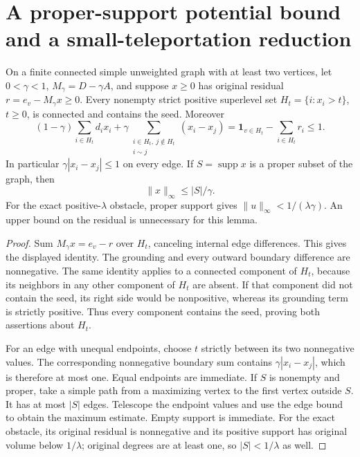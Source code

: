 \section{A proper-support potential bound and a small-teleportation reduction}
\label{sec:op3-small-alpha-floor}

\begin{lemma}
\label{lem:op3-superlevel-potential-cap}
On a finite connected simple unweighted graph with at least two vertices,
let $0<\gamma<1$, $M_\gamma=D-\gamma A$, and suppose
$x\geq0$ has original residual $r=e_v-M_\gamma x\geq0$.
Every nonempty strict positive superlevel set $H_t=\{i:x_i>t\}$,
$t\geq0$, is connected and contains the seed. Moreover
\[
 (1-\gamma)\sum_{i\in H_t}d_ix_i
 +\gamma\sum_{\substack{i\in H_t,\ j\notin H_t\\i\sim j}}
 (x_i-x_j)
 =\boldsymbol{1}_{v\in H_t}-\sum_{i\in H_t}r_i\leq1.
\]
In particular $\gamma|x_i-x_j|\leq1$ on every edge. If
$S=\operatorname{supp}x$ is a proper subset of the graph, then
\[
 \|x\|_\infty\leq |S|/\gamma.
\]
For the exact positive-$\lambda$ obstacle, proper support gives
$\|u\|_\infty<1/(\lambda\gamma)$.
An upper bound on the residual is unnecessary for this lemma.
\end{lemma}
\begin{proof}
Sum $M_\gamma x=e_v-r$ over $H_t$, canceling internal edge
differences. This gives the displayed identity. The grounding and every
outward boundary difference are nonnegative. The same identity applies
to a connected component of $H_t$, because its neighbors in any other
component of $H_t$ are absent. If that component did not contain the
seed, its right side would be nonpositive, whereas its grounding term
is strictly positive. Thus every component contains the seed, proving
both assertions about $H_t$.

For an edge with unequal endpoints, choose $t$ strictly between its
two nonnegative values. The corresponding nonnegative boundary sum
contains $\gamma|x_i-x_j|$, which is therefore at most one. Equal
endpoints are immediate. If $S$ is nonempty and proper, take a simple
path from a maximizing vertex to the first vertex outside $S$.
It has at most $|S|$ edges. Telescope the endpoint values and use the
edge bound to obtain the maximum estimate. Empty support is immediate.
For the exact obstacle, its original residual is nonnegative and its
positive support has original volume below $1/\lambda$; original
degrees are at least one, so $|S|<1/\lambda$ as well.
\end{proof}

